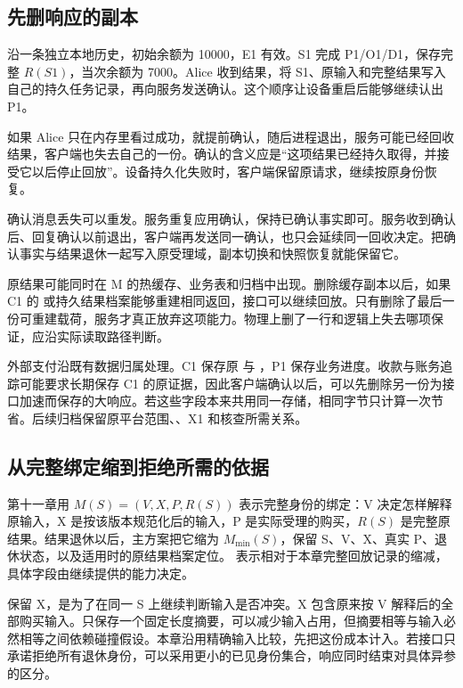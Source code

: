 \subsection*{先删响应的副本}

沿一条独立本地历史，初始余额为 10000，E1 有效。S1 完成 P1/O1/D1，保存完整 $R(S1)$，当次余额为 7000。Alice 收到结果，将 S1、原输入和完整结果写入自己的持久任务记录，再向服务发送确认。这个顺序让设备重启后能够继续认出 P1。

如果 Alice 只在内存里看过成功，就提前确认，随后进程退出，服务可能已经回收结果，客户端也失去自己的一份。确认的含义应是“这项结果已经持久取得，并接受它以后停止回放”。设备持久化失败时，客户端保留原请求，继续按原身份恢复。

确认消息丢失可以重发。服务重复应用确认，保持已确认事实即可。服务收到确认后、回复确认以前退出，客户端再发送同一确认，也只会延续同一回收决定。把确认事实与结果退休一起写入原受理域，副本切换和快照恢复就能保留它。

原结果可能同时在 M 的热缓存、业务表和归档中出现。删除缓存副本以后，如果 C1 的  或持久结果档案能够重建相同返回，接口可以继续回放。只有删除了最后一份可重建载荷，服务才真正放弃这项能力。物理上删了一行和逻辑上失去哪项保证，应沿实际读取路径判断。


外部支付沿既有数据归属处理。C1 保存原  与 ，P1 保存业务进度。收款与账务追踪可能要求长期保存 C1 的原证据，因此客户端确认以后，可以先删除另一份为接口加速而保存的大响应。若这些字段本来共用同一存储，相同字节只计算一次节省。后续归档保留原平台范围、、X1 和核查所需关系。

\subsection*{从完整绑定缩到拒绝所需的依据}

第十一章用 $M(S)=(V,X,P,R(S))$ 表示完整身份的绑定：V 决定怎样解释原输入，X 是按该版本规范化后的输入，P 是实际受理的购买，$R(S)$ 是完整原结果。结果退休以后，主方案把它缩为 $M_{\min}(S)$，保留 S、V、X、真实 P、退休状态，以及适用时的原结果档案定位。 表示相对于本章完整回放记录的缩减，具体字段由继续提供的能力决定。

保留 X，是为了在同一 S 上继续判断输入是否冲突。X 包含原来按 V 解释后的全部购买输入。只保存一个固定长度摘要，可以减少输入占用，但摘要相等与输入必然相等之间依赖碰撞假设。本章沿用精确输入比较，先把这份成本计入。若接口只承诺拒绝所有退休身份，可以采用更小的已见身份集合，响应同时结束对具体异参的区分。

